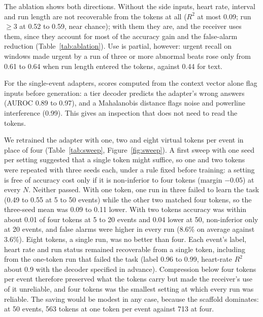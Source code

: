 \begin{table}[t]
\caption{Recoverability of each event's fields from its virtual tokens (final adapter, main sender), decoders trained on the training records and applied to the test records. Token columns give the range over slots 0 and 49 and three seeds. The multilayer perceptron was the decoder specified in advance; the linear decoder is reported for comparison.}
\label{tab:recover}
\centering
\footnotesize
{}
\end{table}

 The ablation shows both directions. Without the side inputs, heart rate, interval and run length are not recoverable from the tokens at all ($R^2$ at most 0.09; run $\geq 3$ at 0.52 to 0.59, near chance); with them they are, and the receiver uses them, since they account for most of the accuracy gain and the false-alarm reduction (Table~\ref{tab:ablation}). Use is partial, however: urgent recall on windows made urgent by a run of three or more abnormal beats rose only from 0.61 to 0.64 when run length entered the tokens, against 0.44 for text.

 For the single-event adapters, scores computed from the context vector alone flag inputs before generation: a tier decoder predicts the adapter's wrong answers (AUROC 0.89 to 0.97), and a Mahalanobis distance flags noise and powerline interference (0.99). This gives an inspection that does not need to read the tokens.

 We retrained the adapter with one, two and eight virtual tokens per event in place of four (Table~\ref{tab:sweep}, Figure~\ref{fig:sweep}). A first sweep with one seed per setting suggested that a single token might suffice, so one and two tokens were repeated with three seeds each, under a rule fixed before training: a setting is free of accuracy cost only if it is non-inferior to four tokens (margin $-0.05$) at every $N$. Neither passed. With one token, one run in three failed to learn the task (0.49 to 0.55 at 5 to 50 events) while the other two matched four tokens, so the three-seed mean was 0.09 to 0.11 lower. With two tokens accuracy was within about 0.01 of four tokens at 5 to 20 events and 0.04 lower at 50, non-inferior only at 20 events, and false alarms were higher in every run (8.6\% on average against 3.6\%). Eight tokens, a single run, was no better than four. Each event's label, heart rate and run status remained recoverable from a single token, including from the one-token run that failed the task (label 0.96 to 0.99, heart-rate $R^2$ about 0.9 with the decoder specified in advance). Compression below four tokens per event therefore preserved what the tokens carry but made the receiver's use of it unreliable, and four tokens was the smallest setting at which every run was reliable. The saving would be modest in any case, because the scaffold dominates: at 50 events, 563 tokens at one token per event against 713 at four.

